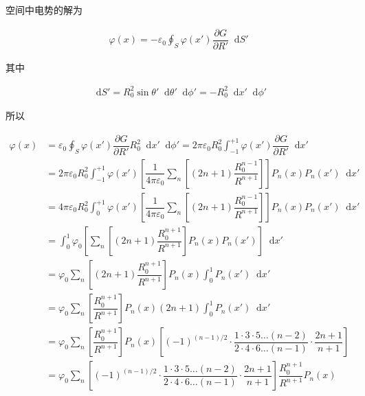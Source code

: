 \documentclass{article}
\newcommand*{\md}{\mathop{}\!\mathrm{d}}
\begin{document}
空间中电势的解为

\begin{equation*}
  \begin{aligned}
    \varphi \left( x \right) = - \varepsilon_0 \oint_S \varphi \left( x' \right) \dfrac{\partial G}{\partial R'}  \md S'
  \end{aligned}
\end{equation*}

其中

\begin{equation*}
  \begin{aligned}
    \md S' = R_0^2 \sin \theta' \md \theta' \md \phi' = - R_0^2 \md x' \md \phi'
  \end{aligned}
\end{equation*}

所以

\begin{equation*}
  \begin{aligned}
    \varphi \left( x \right) &= \varepsilon_0 \oint_S \varphi \left( x' \right) \dfrac{\partial G}{\partial R'} R_0^2 \md x' \md \phi'
    = 2 \pi \varepsilon_0 R_0^2 \int_{-1}^{+1} \varphi \left( x' \right) \dfrac{\partial G}{\partial R'} \md x' \\
    &= 2 \pi \varepsilon_0 R_0^2 \int_{-1}^{+1} \varphi \left( x' \right) \left[ \dfrac{1}{4\pi \varepsilon_0} \sum_n \left[ \left( 2n+1 \right) \dfrac{R_0^{n-1} }{R^{n+1}} \right] \right] P_n \left( x \right) P_n \left( x' \right) \md x' \\
    &= 4 \pi \varepsilon_0 R_0^2 \int_0^{+1} \varphi \left( x' \right) \left[\dfrac{1}{4\pi \varepsilon_0} \sum_n \left[ \left( 2n+1 \right) \dfrac{R_0^{n-1} }{R^{n+1}} \right]  \right] P_n \left( x \right) P_n \left( x' \right) \md x' \\
    &= \int_0^1 \varphi_0  \left[ \sum_n \left[ \left( 2n+1 \right) \dfrac{R_0^{n+1} }{R^{n+1}} \right] P_n \left( x \right) P_n \left( x' \right) \right] \md x' \\
    &= \varphi_0 \sum_n  \left[ \left( 2n+1 \right) \dfrac{R_0^{n+1} }{R^{n+1}} \right] P_n \left( x \right) \int_0^1  P_n \left( x' \right) \md x' \\
    &= \varphi_0 \sum_n  \left[  \dfrac{R_0^{n+1} }{R^{n+1}} \right] P_n \left( x \right) \left( 2n+1 \right) \int_0^1  P_n \left( x' \right) \md x' \\
    &= \varphi_0 \sum_n  \left[ \dfrac{R_0^{n+1} }{R^{n+1}} \right] P_n \left( x \right) \left[ \left( -1  \right)^{\left( n-1 \right)/ 2} \cdot \dfrac{1 \cdot 3 \cdot 5 \dots \left( n-2 \right)}{2 \cdot 4 \cdot 6 \dots \left( n-1 \right)} \cdot \dfrac{2n+1}{n+1} \right] \\
    &= \varphi_0 \sum_n  \left[ \left( -1  \right)^{\left( n-1 \right)/ 2} \cdot \dfrac{1 \cdot 3 \cdot 5 \dots \left( n-2 \right)}{2 \cdot 4 \cdot 6 \dots \left( n-1 \right)} \cdot \dfrac{2n+1}{n+1} \right] \dfrac{R_0^{n+1} }{R^{n+1}} P_n \left( x \right) 
  \end{aligned}
\end{equation*}
\end{document}
